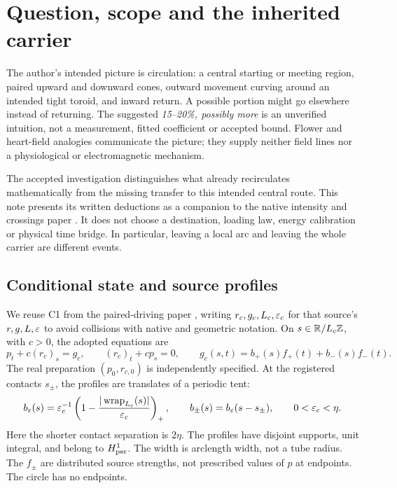\section{Question, scope and the inherited carrier}\label{sec:scope}
The author's intended picture is circulation: a central starting or meeting region, paired upward and downward cones, outward movement curving around an intended tight toroid, and inward return. A possible portion might go elsewhere instead of returning. The suggested \emph{15--20\%, possibly more} is an unverified intuition, not a measurement, fitted coefficient or accepted bound. Flower and heart-field analogies communicate the picture; they supply neither field lines nor a physiological or electromagnetic mechanism.

The accepted investigation \cite{assessment} distinguishes what already recirculates mathematically from the missing transfer to this intended central route. This note presents its written deductions as a companion to the native intensity and crossings paper \cite{intensity}. It does not choose a destination, loading law, energy calibration or physical time bridge. In particular, leaving a local arc and leaving the whole carrier are different events.

\subsection{Conditional state and source profiles}\label{sec:carrier}
We reuse C1 from the paired-driving paper \cite[carrier and foundations sections]{pairedII}, writing $r_c,g_c,L_c,\varepsilon_c$ for that source's $r,g,L,\varepsilon$ to avoid collisions with native and geometric notation. On $s\in\mathbb R/L_c\mathbb Z$, with $c>0$, the adopted equations are
\begin{equation}\label{eq:C1}
 p_t+c(r_c)_s=g_c,\qquad (r_c)_t+cp_s=0,\qquad
 g_c(s,t)=b_+(s)f_+(t)+b_-(s)f_-(t).
\end{equation}
The real preparation $(p_0,r_{c,0})$ is independently specified. At the registered contacts $s_\pm$, the profiles are translates of a periodic tent:
\begin{equation}\label{eq:tent}
 b_\varepsilon(s)=\varepsilon_c^{-1}\left(1-\frac{|\operatorname{wrap}_{L_c}(s)|}{\varepsilon_c}\right)_+,
 \qquad b_\pm(s)=b_\varepsilon(s-s_\pm),\qquad 0<\varepsilon_c<\eta.
\end{equation}
Here the shorter contact separation is $2\eta$. The profiles have disjoint supports, unit integral, and belong to $H^1_{\rm per}$. The width is arclength width, not a tube radius. The $f_\pm$ are distributed source strengths, not prescribed values of $p$ at endpoints. The circle has no endpoints.


